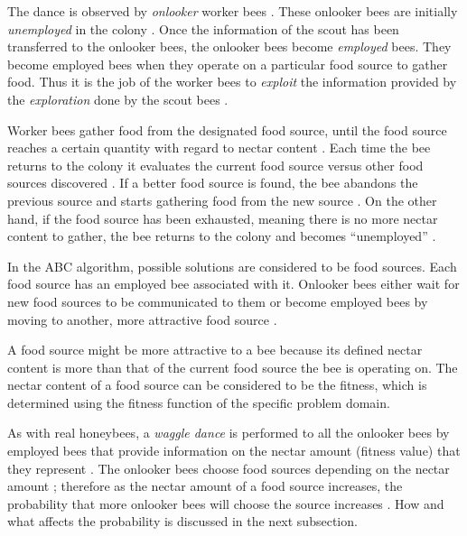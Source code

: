 The dance is observed by \emph{onlooker} worker bees \cite{ABCCompareStudy,ABCImageEnhancement}. These onlooker bees are initially \emph{unemployed} in the colony \cite{ABCCompareStudy,ABCImageEnhancement}. Once the information of the scout has been transferred to the onlooker bees, the onlooker bees become \emph{employed} bees\cite{ABCCompareStudy,ABCImageEnhancement}. They become employed bees when they operate on a particular food source to gather food\cite{ABCCompareStudy,ABCImageEnhancement}. Thus it is the job of the worker bees to \emph{exploit} the information provided by the \emph{exploration} done by the scout bees \cite{ABCCompareStudy,ABCNumericalOptimization}. 

Worker bees gather food from the designated food source, until the food source reaches a certain quantity with regard to nectar content \cite{ABCCompareStudy,ABCNumericalOptimization}. Each time the bee returns to the colony it evaluates the current food source versus other food sources discovered \cite{ABCCompareStudy,ABCNumericalOptimization}. If a better food source is found, the bee abandons the previous source and starts gathering food from the new source \cite{ABCCompareStudy,ABCNumericalOptimization}. On the other hand, if the food source has been exhausted, meaning there is no more nectar content to gather, the bee returns to the colony and becomes ``unemployed'' \cite{ABCCompareStudy,ABCNumericalOptimization}.

In the \gls{ABC} algorithm, possible solutions are considered to be food sources\cite{ABCCompareStudy,ABCNumericalOptimization}. Each food source has an employed bee associated with it. Onlooker bees either wait for new food sources to be communicated to them or become employed bees by moving to another, more attractive food source \cite{ABCCompareStudy,ABCNumericalOptimization}. 

A food source might be more attractive to a bee because its defined nectar content is more than that of the current food source the bee is operating on\cite{ABCCompareStudy,ABCNumericalOptimization}. The nectar content of a food source can be considered to be the fitness, which is determined using the fitness function of the specific problem domain\cite{ABCCompareStudy,ABCNumericalOptimization}.

As with real honeybees, a \emph{waggle dance} is performed to all the onlooker bees by employed bees that provide information on the nectar amount (fitness value) that they represent \cite{ABCReconfigDistro,ABCCompareStudy,ABCImageEnhancement}. The onlooker bees choose food sources depending on the nectar amount \cite{ABCReconfigDistro,ABCCompareStudy,ABCImageEnhancement}; therefore as the nectar amount of a food source increases, the probability that more onlooker bees will choose the source increases \cite{ABCReconfigDistro,ABCCompareStudy,ABCImageEnhancement}. How and what affects the probability is discussed in the next subsection.

